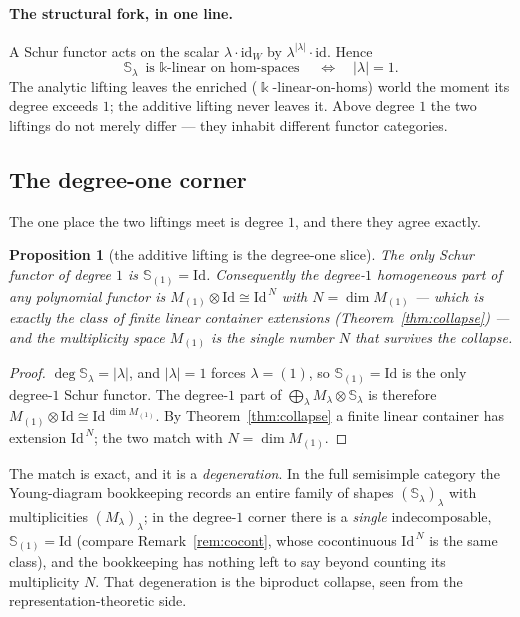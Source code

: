 \documentclass[11pt]{amsart}
\theoremstyle{plain}
\newtheorem{proposition}[theorem]{Proposition}
\theoremstyle{definition}
\newcommand{\id}{\mathrm{id}}
\newcommand{\Id}{\mathrm{Id}}
\newcommand{\fld}{\Bbbk}
\newcommand{\iso}{\cong}
\begin{document}
\paragraph{The structural fork, in one line.} A Schur functor acts on the
scalar $\lambda\cdot\id_W$ by $\lambda^{|\lambda|}\cdot\id$. Hence
\[
  \mathbb S_\lambda\ \text{is $\fld$-linear on hom-spaces}\quad\iff\quad |\lambda|=1.
\]
The analytic lifting leaves the enriched ($\fld$-linear-on-homs) world the moment
its degree exceeds $1$; the additive lifting never leaves it. Above degree $1$
the two liftings do not merely differ --- they inhabit different functor
categories.

\subsection{The degree-one corner}

The one place the two liftings meet is degree $1$, and there they agree exactly.

\begin{proposition}[the additive lifting is the degree-one slice]\label{prop:deg1}
The only Schur functor of degree $1$ is $\mathbb S_{(1)}=\Id$. Consequently the
degree-$1$ homogeneous part of any polynomial functor is
$M_{(1)}\otimes\Id\iso\Id^{\,N}$ with $N=\dim M_{(1)}$ --- which is exactly the
class of finite linear container extensions (Theorem~\ref{thm:collapse}) --- and
the multiplicity space $M_{(1)}$ \emph{is} the single number $N$ that survives
the collapse.
\end{proposition}

\begin{proof}
$\deg\mathbb S_\lambda=|\lambda|$, and $|\lambda|=1$ forces $\lambda=(1)$, so
$\mathbb S_{(1)}=\Id$ is the only degree-$1$ Schur functor. The degree-$1$ part
of $\bigoplus_\lambda M_\lambda\otimes\mathbb S_\lambda$ is therefore
$M_{(1)}\otimes\Id\iso\Id^{\,\dim M_{(1)}}$. By Theorem~\ref{thm:collapse} a
finite linear container has extension $\Id^{\,N}$; the two match with
$N=\dim M_{(1)}$.
\end{proof}

The match is exact, and it is a \emph{degeneration}. In the full semisimple
category the Young-diagram bookkeeping records an entire family of shapes
$(\mathbb S_\lambda)_\lambda$ with multiplicities $(M_\lambda)_\lambda$; in the
degree-$1$ corner there is a \emph{single} indecomposable, $\mathbb S_{(1)}=\Id$
(compare Remark~\ref{rem:cocont}, whose cocontinuous $\Id^{\,N}$ is the same
class), and the bookkeeping has nothing left to say beyond counting its
multiplicity $N$. That degeneration is the biproduct collapse, seen from the
representation-theoretic side.
\end{document}
